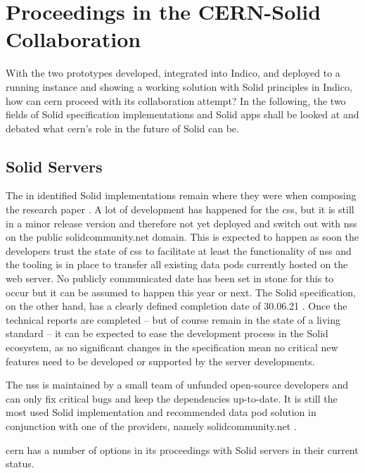 \section{Proceedings in the CERN-Solid Collaboration}

With the two prototypes developed, integrated into Indico, and deployed to a running instance and showing a working solution with Solid principles in Indico, how can \gls{cern} proceed with its collaboration attempt? In the following, the two fields of Solid specification implementations and Solid apps shall be looked at and debated what \gls{cern}'s role in the future of Solid can be.

\subsection{Solid Servers}

The in \cite{cern-solid-investigation-spec} identified Solid implementations remain where they were when composing the research paper \cite{cern-solid-investigation-spec}. A lot of development has happened for the \gls{css}, but it is still in a minor release version and therefore not yet deployed and switch out with \gls{nss} on the public solidcommunity.net domain. This is expected to happen as soon the developers trust the state of \gls{css} to facilitate at least the functionality of \gls{nss} and the tooling is in place to transfer all existing data pods currently hosted on the web server. No publicly communicated date has been set in stone for this to occur but it can be assumed to happen this year or next. The Solid specification, on the other hand, has a clearly defined completion date of 30.06.21 \cite{solid-tr}. Once the technical reports are completed -- but of course remain in the state of a living standard -- it can be expected to ease the development process in the Solid ecosystem, as no significant changes in the specification mean no critical new features need to be developed or supported by the server developments.

The \gls{nss} is maintained by a small team of unfunded open-source developers and can only fix critical bugs and keep the dependencies up-to-date. It is still the most used Solid implementation and recommended data pod solution in conjunction with one of the providers, namely solidcommunity.net \cite{solid-community}.

\gls{cern} has a number of options in its proceedings with Solid servers in their current status.

